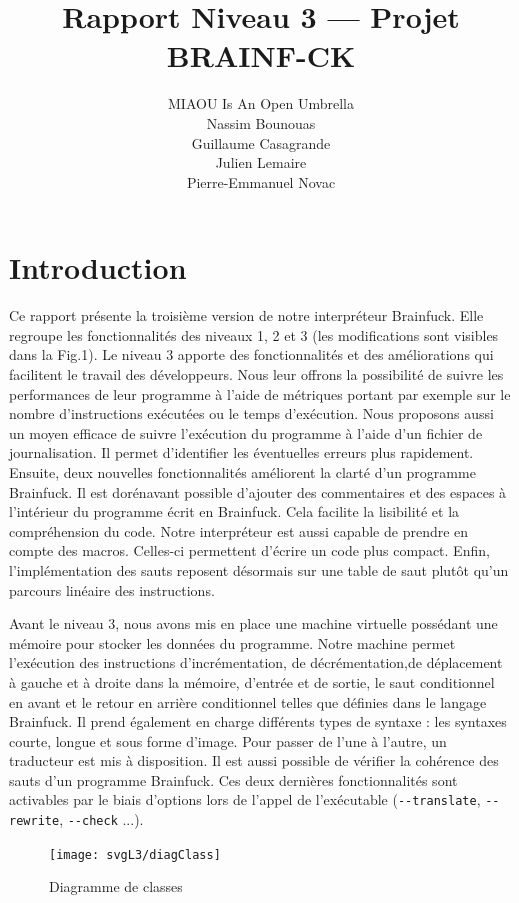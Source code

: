 \documentclass{article}
\author{MIAOU Is An Open Umbrella\\Nassim Bounouas\\Guillaume Casagrande\\Julien Lemaire\\Pierre-Emmanuel Novac}
\title{\vspace{-1cm}Rapport Niveau 3 --- Projet BRAINF-CK}
\begin{document}
\maketitle

\section{Introduction}

    Ce rapport présente la troisième version de notre interpréteur Brainfuck. Elle regroupe les fonctionnalités des niveaux 1, 2 et 3 (les modifications sont visibles dans la Fig.1).
    Le niveau 3 apporte des fonctionnalités et des améliorations qui facilitent le travail des développeurs. Nous leur offrons la possibilité de suivre les performances de leur programme à l’aide de métriques portant par exemple sur le nombre d'instructions exécutées ou le temps d'exécution. Nous proposons aussi un moyen efficace de suivre l’exécution du programme à l'aide d'un fichier de journalisation. Il permet d’identifier les éventuelles erreurs plus rapidement. Ensuite, deux nouvelles fonctionnalités améliorent la clarté d'un programme Brainfuck. Il est dorénavant possible d’ajouter des commentaires et des espaces à l’intérieur du programme écrit en Brainfuck. Cela facilite la lisibilité et la compréhension du code. Notre interpréteur est aussi capable de prendre en compte des macros. Celles-ci permettent d’écrire un code plus compact. Enfin, l'implémentation des sauts reposent désormais sur une table de saut plutôt qu'un parcours linéaire des instructions.

    Avant le niveau 3, nous avons mis en place une machine virtuelle possédant une mémoire pour stocker les données du programme. Notre machine permet l'exécution des instructions d'incrémentation, de décrémentation,de déplacement à gauche et à droite dans la mémoire, d'entrée et de sortie, le saut conditionnel en avant et le retour en arrière conditionnel telles que définies dans le langage Brainfuck. Il prend également en charge différents types de syntaxe : les syntaxes courte, longue et sous forme d’image. Pour passer de l’une à l’autre, un traducteur est mis à disposition. Il est aussi possible de vérifier la cohérence des sauts d’un programme Brainfuck. Ces deux dernières fonctionnalités sont activables par le biais d'options lors de l'appel de l'exécutable (\texttt{-{}-translate}, \texttt{-{}-rewrite}, \texttt{-{}-check} ...).

\begin{figure}[!ht]
	\centering
	\texttt{[image: svgL3/diagClass]}
	\caption{Diagramme de classes}
\end{figure}
\end{document}
